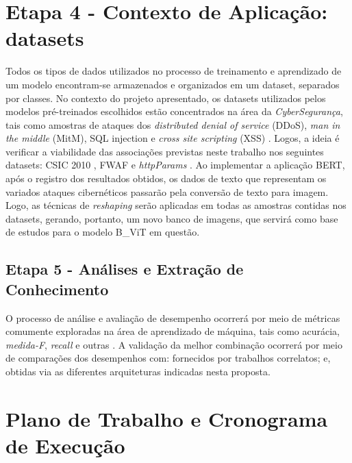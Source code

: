 \section{Etapa 4 - Contexto de Aplicação: datasets}
Todos os tipos de dados utilizados no processo de treinamento e aprendizado de um modelo encontram-se armazenados e organizados em um dataset, separados por classes. No contexto do projeto apresentado, os datasets utilizados pelos modelos pré-treinados escolhidos estão concentrados na área da \textit{CyberSegurança}, tais como amostras de ataques dos \textit{distributed denial of service} (DDoS), \textit{man in the middle} (MitM), SQL injection e \textit{cross site scripting} (XSS) \cite{luxemburk2021detection}. Logos, a ideia é verificar a viabilidade das associações previstas neste trabalho nos seguintes datasets: CSIC 2010 \cite{gimenez2010http}, FWAF \cite{ahmad2017web} e \textit{httpParams} \cite{morzeux2020httpparams}. Ao implementar a aplicação BERT, após o registro dos resultados obtidos, os dados de texto que representam os variados ataques cibernéticos passarão pela conversão de texto para imagem. Logo, as técnicas de \textit{reshaping} serão aplicadas em todas as amostras contidas nos datasets, gerando, portanto, um novo banco de imagens, que servirá como base de estudos para o modelo B\_ViT em questão.

\subsection{Etapa 5 - Análises e Extração de Conhecimento}

O processo de análise e avaliação de desempenho ocorrerá por meio de métricas comumente exploradas na área de aprendizado de máquina, tais como acurácia, \textit{medida-F}, \textit{recall} e outras \cite{duda2012pattern}. A validação da melhor combinação ocorrerá por meio de comparações dos desempenhos com: fornecidos por trabalhos correlatos; e, obtidas via as diferentes arquiteturas indicadas nesta proposta.

\section{Plano de Trabalho e Cronograma de Execução}

